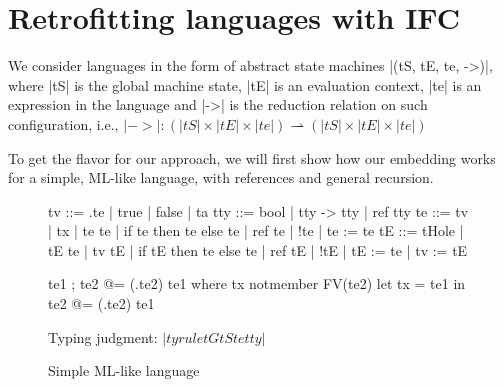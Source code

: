 \section{Retrofitting languages with IFC}
\label{sec:retrofit}


We consider languages in the form of abstract state machines |(tS, tE,
te, ->)|, where |tS| is the global machine state, |tE| is an evaluation
context, |te| is an expression in the language and |->| is the
reduction relation on such configuration, i.e., $|->| : (|tS| \times
|tE| \times |te|) \rightharpoonup (|tS| \times |tE| \times |te|)$ 


To get the flavor for our approach, we will first show how our embedding
works for a simple, ML-like language, with references and general recursion.

\begin{figure}
\begin{code}
tv   ::= \tx.te | true | false | ta
tty   ::= bool | tty -> tty | ref tty
te   ::= tv | tx | te te | if te then te else te | ref te | !te | te := te
tE   ::= tHole | tE te | tv tE | if tE then te else te
       | ref tE | !tE | tE := te | tv := tE 

te1 ; te2            @= (\tx.te2) te1  where  tx notmember FV(te2)
let tx = te1 in te2  @= (\tx.te2) te1
\end{code}

Typing judgment: $|tyrule tG tS te tty|$


\caption{Simple ML-like language}
\label{fig:ml}
\end{figure}

